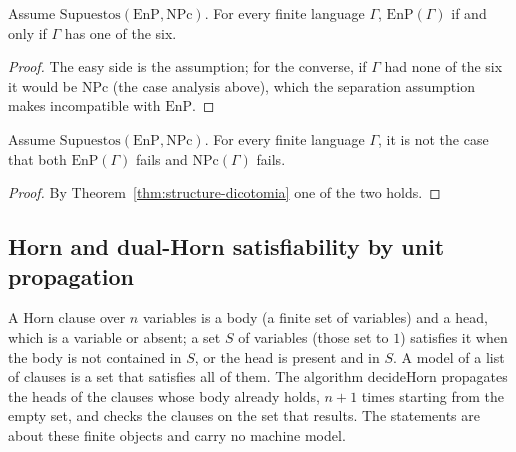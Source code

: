 \begin{theorem}
  \label{thm:structure-interruptor}
  \leanok
  Assume $\mathrm{Supuestos}(\mathrm{EnP}, \mathrm{NPc})$. For every finite language $\Gamma$,
  $\mathrm{EnP}(\Gamma)$ if and only if $\Gamma$ has one of the six.
  \own{}
\end{theorem}

\begin{proof}
  \leanok
  The easy side is the assumption; for the converse, if $\Gamma$ had none of the six it would be
  $\mathrm{NPc}$ (the case analysis above), which the separation assumption makes incompatible with
  $\mathrm{EnP}$.
\end{proof}

\begin{theorem}
  \label{thm:structure-sin-intermedios}
  \leanok
  Assume $\mathrm{Supuestos}(\mathrm{EnP}, \mathrm{NPc})$. For every finite language $\Gamma$, it is
  not the case that both $\mathrm{EnP}(\Gamma)$ fails and $\mathrm{NPc}(\Gamma)$ fails.
  \own{}
\end{theorem}

\begin{proof}
  \leanok
  By Theorem~\ref{thm:structure-dicotomia} one of the two holds.
\end{proof}

\subsection{Horn and dual-Horn satisfiability by unit propagation}

A Horn clause over $n$ variables is a body (a finite set of variables) and a head, which is a
variable or absent; a set $S$ of variables (those set to $1$) satisfies it when the body is not
contained in $S$, or the head is present and in $S$. A model of a list of clauses is a set that
satisfies all of them. The algorithm $\mathrm{decideHorn}$ propagates the heads of the clauses whose
body already holds, $n + 1$ times starting from the empty set, and checks the clauses on the set
that results. The statements are about these finite objects and carry no machine model.

